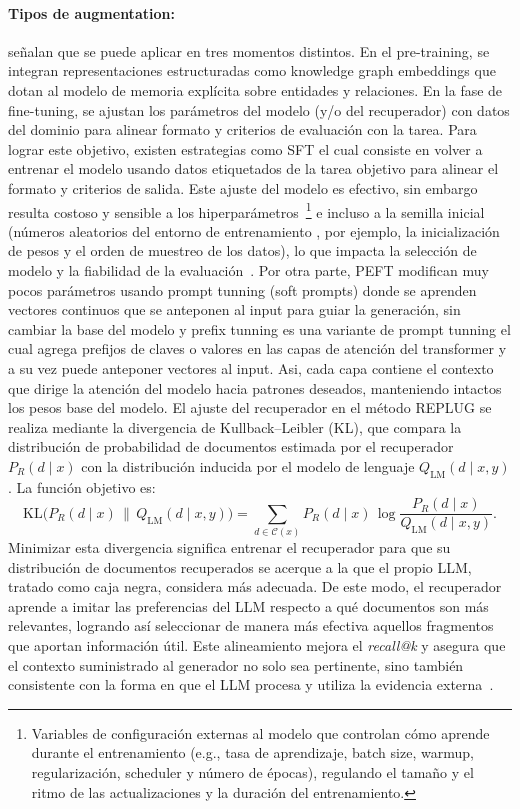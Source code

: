 \paragraph{Tipos de augmentation:} \textcite{zhao2024rag} señalan que se puede aplicar en tres momentos distintos. En el pre-training, se integran representaciones estructuradas 
como knowledge graph embeddings que dotan al modelo de memoria explícita sobre entidades y relaciones. En la fase de fine-tuning, se ajustan los parámetros del modelo 
(y/o del recuperador) con datos del dominio para alinear formato y criterios de evaluación con la tarea. Para lograr este objetivo, existen estrategias como SFT el cual 
consiste en volver a entrenar el modelo usando datos etiquetados de la tarea objetivo para alinear el formato y criterios de salida. 
Este ajuste del modelo es efectivo, sin embargo resulta costoso y sensible a los hiperparámetros~\footnote{%
Variables de configuración externas al modelo que controlan cómo aprende durante el entrenamiento (e.g., tasa de aprendizaje, batch size, warmup, regularización, scheduler
y número de épocas), regulando el tamaño y el ritmo de las actualizaciones y la duración del entrenamiento.}%
e incluso a la semilla inicial (números aleatorios del entorno de entrenamiento , por ejemplo, la inicialización de pesos y el orden de muestreo de los datos), 
lo que impacta la selección de modelo y la fiabilidad de la evaluación~\textcite{casola2022pretrained}.
Por otra parte, PEFT modifican muy pocos parámetros usando prompt tunning (soft prompts) donde se aprenden vectores continuos que se anteponen al input para guiar la generación, 
sin cambiar la base del modelo y prefix tunning es una variante de prompt tunning el cual agrega prefijos de claves o valores en las capas de atención del transformer y a su vez
puede anteponer vectores al input. Asi, cada capa contiene el contexto que dirige la atención del modelo hacia patrones deseados, manteniendo intactos los pesos base del modelo.
El ajuste del recuperador en el método REPLUG se realiza mediante la divergencia de Kullback–Leibler (KL), que compara la distribución de probabilidad de documentos
estimada por el recuperador $P_{R}(d \mid x)$ con la distribución inducida por el modelo de lenguaje $Q_{\mathrm{LM}}(d \mid x,y)$. La función objetivo es:
\[
\mathrm{KL}\!\big(P_{R}(d\mid x)\,\|\,Q_{\mathrm{LM}}(d\mid x,y)\big)
= \sum_{d\in\mathcal{C}(x)} P_{R}(d\mid x)\,\log\!\frac{P_{R}(d\mid x)}{Q_{\mathrm{LM}}(d\mid x,y)}.
\]
Minimizar esta divergencia significa entrenar el recuperador para que su distribución de documentos recuperados se acerque a la que el propio LLM, tratado como caja negra, 
considera más adecuada. De este modo, el recuperador aprende a imitar las preferencias del LLM respecto a qué documentos son más relevantes, 
logrando así seleccionar de manera más efectiva aquellos fragmentos que aportan información útil. Este alineamiento mejora el \textit{recall@k} y asegura que el contexto
suministrado al generador no solo sea pertinente, sino también consistente con la forma en que el LLM procesa y utiliza la evidencia externa~\textcite{gao2023rag}.

